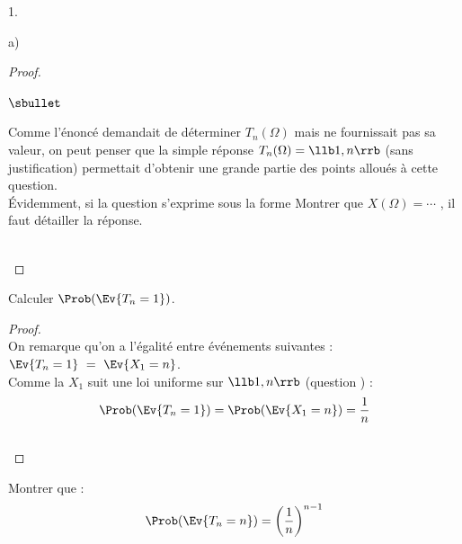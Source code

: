 \begin{noliste}{1.}
\begin{noliste}{a)}
\begin{proof}
\begin{remark}
\begin{noliste}{$\sbullet$}
        \item Comme l'énoncé demandait de déterminer $T_n(\Omega)$
          mais ne fournissait pas sa valeur, on peut penser que la
          simple réponse \og $T_n(\Omega)=\llb 1,n\rrb$ \fg{} (sans
          justification) permettait d'obtenir une grande partie des
          points alloués à cette question.\\
          Évidemment, si la question s'exprime sous la forme \og
          Montrer que $X(\Omega) = \cdots$ \fg{}, il faut détailler la
          réponse.
	\end{noliste}
      \end{remark}~\\[-1.4cm]
    \end{proof}
    
  \item Calculer $\Prob(\Ev{T_n=1})$.
    
    \begin{proof}~\\
      On remarque qu'on a l'égalité entre événements suivantes :
      $
      \Ev{T_n=1} \ = \ \Ev{X_1=n}
      $.\\
      Comme la \var $X_1$ suit une loi uniforme 
      sur $\llb 1,n\rrb$ (question ) :
      \[
      \Prob(\Ev{T_n=1})=\Prob(\Ev{X_1=n})=\dfrac{1}{n}
      \]
      ~\\[-1cm]
    \end{proof}
    
  \item Montrer que :
    \[
    \Prob(\Ev{T_n=n}) = \left(\frac{1}{n}\right)^{n-1}
    \]
    

\end{noliste}
\end{noliste}

